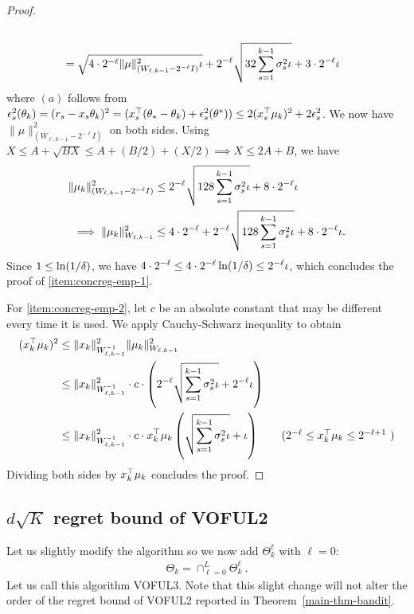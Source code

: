 \begin{proof}
\begin{align*}
    \\&= \sqrt{4\cdot 2^{-\ell} \|\mu\|_{(W_{\ell,k-1} - 2^{-\ell}  I )}^{2}  \iota}  + 2^{-\ell}\sqrt{32 \sum_{s=1}^{k-1} \sigma_s^2 \iota } + 3\cdot2^{-\ell} \iota
  \end{align*}
  where $(a)$ follows from $\epsilon^2_s({\theta}_k) = (r_s - x_s{\theta}_k)^2 = (x_s^\top({\theta}_* - {\theta}_k) + \epsilon_s^2({\theta}^*)) \le 2(x_s^{\top}\mu_k)^2 + 2\epsilon_s^2$.
  We now have $\|\mu\|_{(W_{\ell,k-1} - 2^{-\ell}  I )}^{2}$ on both sides.
  Using $X \le A + \sqrt{B X} \le A + (B/2) + (X/2) \implies X \le 2A + B$, we have
  \begin{align*}
    \|\mu_k\|_{(W_{\ell,k-1} - 2^{-\ell}  I )}^2 
    &\le 2^{-\ell}\sqrt{128\sum_{s=1}^{k-1} \sigma_s^2 \iota}   + 8\cdot 2^{-\ell}\iota
    \\\implies     \|\mu_k\|_{W_{\ell,k-1}}^2 
    &\le 4\cdot 2^{-\ell} + 2^{-\ell}\sqrt{128\sum_{s=1}^{k-1} \sigma_s^2 \iota}   + {8}\cdot 2^{-\ell}\iota.
  \end{align*}
  Since $1 \le \ln(1/{\delta})$, we have $4 \cdot 2^{-\ell}  \le 4 \cdot 2^{-\ell} \ln(1/{\delta}) \le 2^{-\ell}\iota$, which concludes the proof of \ref{item:concreg-emp-1}.
 
  
  For \ref{item:concreg-emp-2}, let $c$ be an absolute constant that may be different every time it is used.
  We apply Cauchy-Schwarz inequality to obtain
  \begin{align*}
    (x_k^\T\mu_k)^2
    &\le \|x_k\|^2_{W_{\ell,k-1}^{-1}}  \|\mu_k\|^2_{W_{\ell,k-1}} 
    \\&\le \|x_k\|^2_{W_{\ell,k-1}^{-1}}  \cd c \cd \del{2^{-\ell}\sqrt{\sum_{s=1}^{k-1}\sig_s^2 \iota} + 2^{-\ell}\iota  }
    \\&\le \|x_k\|^2_{W_{\ell,k-1}^{-1}}  \cd c \cd x_k^\T\mu_k \del{\sqrt{\sum_{s=1}^{k-1}\sig_s^2 \iota} + \iota  }  \tag{$2^{-\ell}\le x_k^\T\mu_k \le 2^{-\ell + 1}$  }
  \end{align*}
  Dividing both sides by $x_k^{\top}\mu_k$ concludes the proof.
\end{proof}


\subsection{$d\sqrt{K}$ regret bound of VOFUL2}
\label{sec:dsqrtK}

Let us slightly modify the algorithm so we now add $\Theta_k^{\ell}$ with $\ell=0$:
\begin{align*}
  \Theta_k = \cap_{\ell=0}^{L} \Theta_k^\ell~.
\end{align*}
Let us call this algorithm VOFUL3.
Note that this slight change will not alter the order of the regret bound of VOFUL2 reported in Theorem~\ref{main-thm-bandit}.

